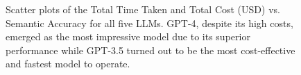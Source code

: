 \begin{figure}[htpb]
  \centering
  \quad 
  \caption[Cost Analysis]{Scatter plots of the Total Time Taken and Total Cost (USD) vs. Semantic Accuracy for all five LLMs. GPT-4, despite its high costs, emerged as the most impressive model due to its superior performance while GPT-3.5 turned out to be the most cost-effective and fastest model to operate.}\label{fig:total-anal}
\end{figure}
